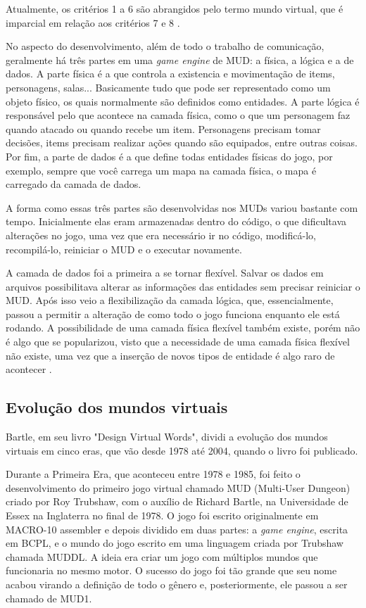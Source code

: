Atualmente, os critérios 1 a 6 são abrangidos pelo termo mundo virtual, que é imparcial em relação aos critérios 7 e 8 \cite{bartle2015multi}.

No aspecto do desenvolvimento, além de todo o trabalho de comunicação, geralmente há três partes em uma 
\textit{game engine} de MUD: a física, a lógica e a de dados. A parte física é a que controla a existencia 
e movimentação de items, personagens, salas... Basicamente tudo que pode ser representado como um objeto 
físico, os quais normalmente são definidos como entidades. A parte lógica é responsável pelo que acontece 
na camada física, como o que um personagem faz quando atacado ou quando recebe um item. Personagens precisam 
tomar decisões, items precisam realizar ações quando são equipados, entre outras coisas. Por fim, a parte 
de dados é a que define todas entidades físicas do jogo, por exemplo, sempre que você carrega um mapa na 
camada física, o mapa é carregado da camada de dados.

A forma como essas três partes são desenvolvidas nos MUDs variou bastante com tempo. Inicialmente 
elas eram armazenadas dentro do código, o que dificultava alterações no jogo, uma vez que era necessário 
ir no código, modificá-lo, recompilá-lo, reiniciar o MUD e o executar novamente.

A camada de dados foi a primeira a se tornar flexível. Salvar os dados em arquivos possibilitava 
alterar as informações das entidades sem precisar reiniciar o MUD. Após isso veio a flexibilização 
da camada lógica, que, essencialmente, passou a permitir a alteração de como todo o jogo funciona 
enquanto ele está rodando. A possibilidade de uma camada física flexível também existe, porém não é 
algo que se popularizou, visto que a necessidade de uma camada física flexível não existe, uma vez 
que a inserção de novos tipos de entidade é algo raro de acontecer \cite{penton2003mud}.

\subsection{Evolução dos mundos virtuais}

Bartle, em seu livro "Design Virtual Words", dividi a evolução dos mundos virtuais em cinco eras, 
que vão desde 1978 até 2004, quando o livro foi publicado.

Durante a Primeira Era, que aconteceu entre 1978 e 1985, foi feito o desenvolvimento do primeiro jogo 
virtual chamado MUD (Multi-User Dungeon) criado por Roy Trubshaw, com o auxílio de Richard Bartle, 
na Universidade de Essex na Inglaterra no final de 1978. O jogo foi escrito originalmente em MACRO-10 
assembler e depois dividido em duas partes: a \textit{game engine}, escrita em BCPL, e o mundo do jogo escrito 
em uma linguagem criada por Trubshaw chamada MUDDL. A ideia era criar um jogo com múltiplos mundos 
que funcionaria no mesmo motor. O sucesso do jogo foi tão grande que seu nome acabou virando a definição 
de todo o gênero e, posteriormente, ele passou a ser chamado de MUD1.

